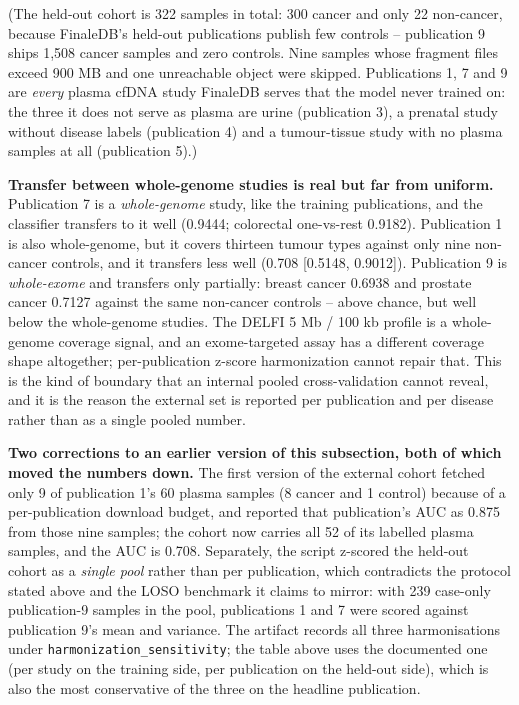 \documentclass[11pt]{article}
\begin{document}
(The held-out cohort is 322 samples in total: 300 cancer and only 22 non-cancer, because FinaleDB's held-out publications publish few controls -- publication 9 ships 1,508 cancer samples and zero controls. Nine samples whose fragment files exceed 900 MB and one unreachable object were skipped. Publications 1, 7 and 9 are \textit{every} plasma cfDNA study FinaleDB serves that the model never trained on: the three it does not serve as plasma are urine (publication 3), a prenatal study without disease labels (publication 4) and a tumour-tissue study with no plasma samples at all (publication 5).)

\textbf{Transfer between whole-genome studies is real but far from uniform.} Publication 7 is a \textit{whole-genome} study, like the training publications, and the classifier transfers to it well (0.9444; colorectal one-vs-rest 0.9182). Publication 1 is also whole-genome, but it covers thirteen tumour types against only nine non-cancer controls, and it transfers less well (0.708 [0.5148, 0.9012]). Publication 9 is \textit{whole-exome} and transfers only partially: breast cancer 0.6938 and prostate cancer 0.7127 against the same non-cancer controls -- above chance, but well below the whole-genome studies. The DELFI 5 Mb / 100 kb profile is a whole-genome coverage signal, and an exome-targeted assay has a different coverage shape altogether; per-publication z-score harmonization cannot repair that. This is the kind of boundary that an internal pooled cross-validation cannot reveal, and it is the reason the external set is reported per publication and per disease rather than as a single pooled number.

\textbf{Two corrections to an earlier version of this subsection, both of which moved the numbers down.} The first version of the external cohort fetched only 9 of publication 1's 60 plasma samples (8 cancer and 1 control) because of a per-publication download budget, and reported that publication's AUC as 0.875 from those nine samples; the cohort now carries all 52 of its labelled plasma samples, and the AUC is 0.708. Separately, the script z-scored the held-out cohort as a \textit{single pool} rather than per publication, which contradicts the protocol stated above and the LOSO benchmark it claims to mirror: with 239 case-only publication-9 samples in the pool, publications 1 and 7 were scored against publication 9's mean and variance. The artifact records all three harmonisations under \texttt{harmonization\_\allowbreak{}sensitivity}; the table above uses the documented one (per study on the training side, per publication on the held-out side), which is also the most conservative of the three on the headline publication.
\end{document}
